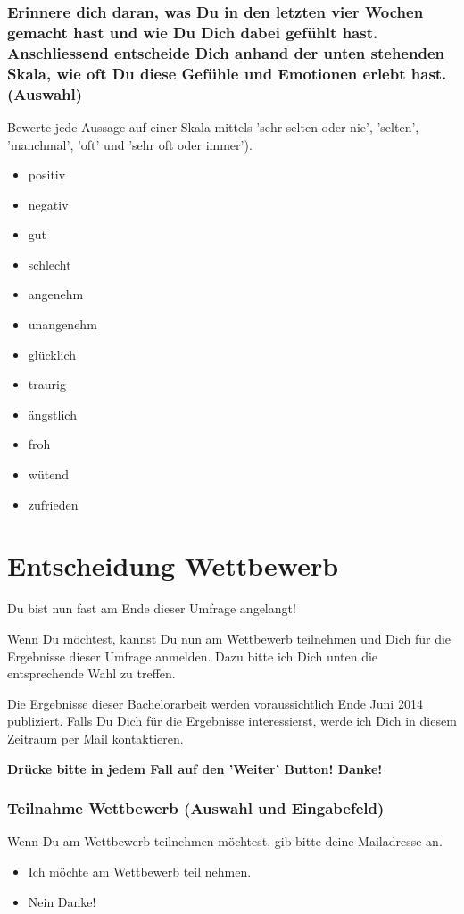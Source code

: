 \subsubsection*{Erinnere dich daran, was Du in den letzten vier Wochen gemacht hast und wie Du Dich dabei gefühlt hast. Anschliessend entscheide Dich anhand der unten stehenden Skala, wie oft Du diese Gefühle und Emotionen erlebt hast. (Auswahl)}
Bewerte jede Aussage auf einer Skala mittels 'sehr selten oder nie', 'selten', 'manchmal', 'oft' und 'sehr oft oder immer').
    \begin{itemize}
      \item positiv
      \item negativ
      \item gut
      \item schlecht
      \item angenehm
      \item unangenehm
      \item glücklich
      \item traurig      
      \item ängstlich
      \item froh
      \item wütend
      \item zufrieden
    \end{itemize}  
\section{Entscheidung Wettbewerb}\label{anhangSection.wettbewerb}   
Du bist nun fast am Ende dieser Umfrage angelangt!\par
Wenn Du möchtest, kannst Du nun am Wettbewerb teilnehmen und Dich für die Ergebnisse dieser Umfrage anmelden. Dazu bitte ich Dich unten die entsprechende Wahl zu treffen. \par
Die Ergebnisse dieser Bachelorarbeit werden voraussichtlich Ende Juni 2014 publiziert. Falls Du Dich für die Ergebnisse interessierst, werde ich Dich in diesem Zeitraum per Mail kontaktieren.\par
\textbf{Drücke bitte in jedem Fall auf den 'Weiter' Button! Danke!}
\subsubsection*{Teilnahme Wettbewerb (Auswahl und Eingabefeld)}
Wenn Du am Wettbewerb teilnehmen möchtest, gib bitte deine Mailadresse an.
    \begin{itemize}
      \item Ich möchte am Wettbewerb teil nehmen.
      \item Nein Danke!      
    \end{itemize}
